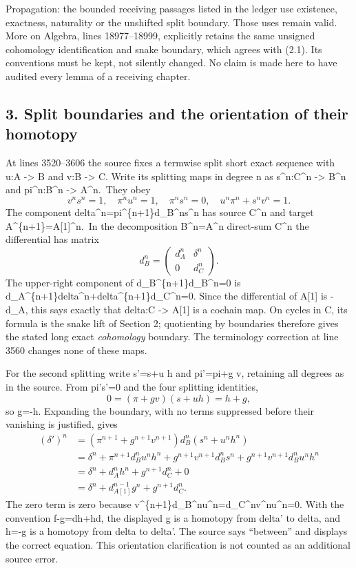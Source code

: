 \documentclass[11pt]{article}
\begin{document}
Propagation: the bounded receiving passages listed in the ledger use existence, exactness, naturality or the unshifted split boundary. Those uses remain valid. More on Algebra, lines 18977--18999, explicitly retains the same unsigned cohomology identification and snake boundary, which agrees with (2.1). Its conventions must be kept, not silently changed. No claim is made here to have audited every lemma of a receiving chapter.

\subsection{3. Split boundaries and the orientation of their homotopy}\label{note-03-split-boundaries-and-the-orientation-of-their-homotopy}

At lines 3520--3606 the source fixes a termwise split short exact sequence with u:A -\textgreater{} B and v:B -\textgreater{} C. Write its splitting maps in degree n as s\^{}n:C\^{}n -\textgreater{} B\^{}n and pi\^{}n:B\^{}n -\textgreater{} A\^{}n.~They obey \[
v^ns^n=1,\quad \pi^nu^n=1,\quad \pi^ns^n=0,\quad
u^n\pi^n+s^nv^n=1.
\] The component delta\^{}n=pi\^{}\{n+1\}d\_B\^{}ns\^{}n has source C\^{}n and target A\^{}\{n+1\}=A{[}1{]}\^{}n.~In the decomposition B\^{}n=A\^{}n direct-sum C\^{}n the differential has matrix \[
d_B^n=
\begin{pmatrix}d_A^n&\delta^n\\0&d_C^n\end{pmatrix}.
\] The upper-right component of d\_B\^{}\{n+1\}d\_B\^{}n=0 is d\_A\^{}\{n+1\}delta\^{}n+delta\^{}\{n+1\}d\_C\^{}n=0. Since the differential of A{[}1{]} is -d\_A, this says exactly that delta:C -\textgreater{} A{[}1{]} is a cochain map. On cycles in C, its formula is the snake lift of Section 2; quotienting by boundaries therefore gives the stated long exact \emph{cohomology} boundary. The terminology correction at line 3560 changes none of these maps.

For the second splitting write s'=s+u h and pi'=pi+g v, retaining all degrees as in the source. From pi's'=0 and the four splitting identities, \[
0=(\pi+gv)(s+uh)=h+g,
\] so g=-h. Expanding the boundary, with no terms suppressed before their vanishing is justified, gives \[
\begin{aligned}
(\delta')^n
&=(\pi^{n+1}+g^{n+1}v^{n+1})d_B^n(s^n+u^nh^n)\\
&=\delta^n+
  \pi^{n+1}d_B^nu^nh^n+
  g^{n+1}v^{n+1}d_B^ns^n+
  g^{n+1}v^{n+1}d_B^nu^nh^n\\
&=\delta^n+d_A^nh^n+g^{n+1}d_C^n+0\\
&=\delta^n+d_{A[1]}^{n-1}g^n+g^{n+1}d_C^n .
\end{aligned}
\] The zero term is zero because v\^{}\{n+1\}d\_B\^{}nu\^{}n=d\_C\^{}nv\^{}nu\^{}n=0. With the convention f-g=dh+hd, the displayed g is a homotopy from delta' to delta, and h=-g is a homotopy from delta to delta'. The source says ``between'' and displays the correct equation. This orientation clarification is not counted as an additional source error.
\end{document}
